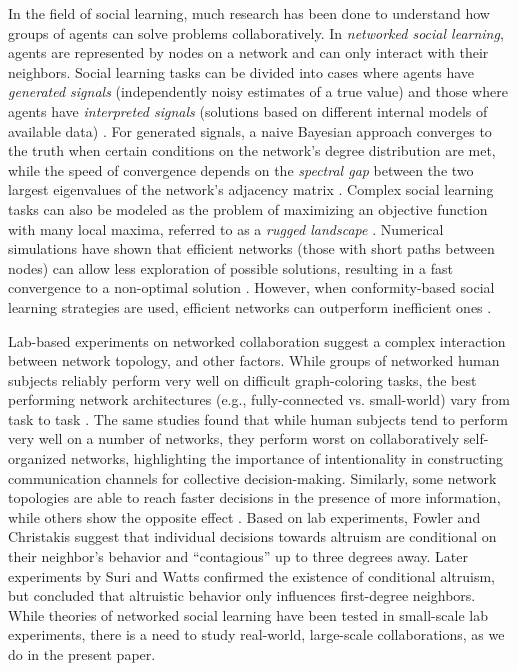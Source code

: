 In the field of social learning,
much research has been done to understand how groups of agents
can solve problems collaboratively.
In {\em networked social learning}, agents are represented by nodes on a network
and can only interact with their neighbors.
Social learning tasks can be divided into cases where agents have {\em generated signals}
(independently noisy estimates of a true value)
and those where agents have {\em interpreted signals}
(solutions based on different internal models of available data)
\cite{hong_interpreted_2009}.
For generated signals,
a naive Bayesian approach converges to the truth when certain conditions
on the network's degree distribution are met,
while the speed of convergence depends on the {\em spectral gap}
between the two largest eigenvalues of the network's adjacency matrix
\cite{degroot_reaching_1974,golub_naive_2010}.
Complex social learning tasks can also be modeled as the problem
of maximizing an objective function with many local maxima,
referred to as a {\em rugged landscape}
\cite{lazer_network_2007,mason_propagation_2008,mason_collaborative_2012,grim_scientific_2013,barkoczi_social_2016}.
Numerical simulations have shown that efficient networks (those with short paths between nodes)
can allow less exploration of possible solutions,
resulting in a fast convergence to a non-optimal solution \cite{mason_propagation_2008,grim_scientific_2013}.
However, when conformity-based social learning strategies are used, efficient networks can outperform
inefficient ones \cite{barkoczi_social_2016}.

Lab-based experiments on networked collaboration
suggest a complex interaction between network topology,
and other factors.
While groups of networked human subjects reliably perform very well on
difficult graph-coloring tasks, the best performing network architectures
(e.g., fully-connected vs. small-world) vary
from task to task \cite{kearns_experiments_2012}.
The same studies found that while human subjects tend to perform very well on
a number of networks, they perform worst on collaboratively self-organized
networks, highlighting the importance of intentionality
in constructing communication channels for collective decision-making.
Similarly, some network topologies are able to reach faster decisions in the
presence of more information, while others show the opposite effect
\cite{kearns_experimental_2006}.
Based on lab experiments, Fowler and Christakis \cite{fowler_cooperative_2010}
suggest that individual decisions towards altruism are conditional on their
neighbor's behavior and ``contagious'' up to three degrees away.
Later experiments by Suri and Watts \cite{suri_cooperation_2011} confirmed the
existence of conditional altruism,
but concluded that altruistic
behavior only influences first-degree neighbors.
While theories of networked social learning have been tested in small-scale lab experiments,
there is a need to study real-world, large-scale collaborations,
as we do in the present paper.

